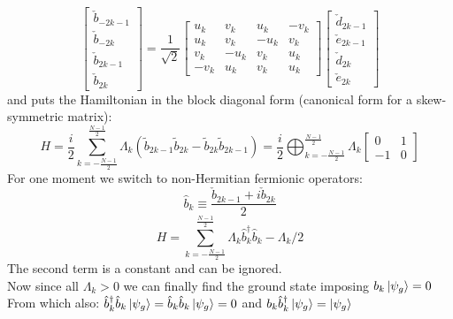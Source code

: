 \documentclass[12pt,a4paper]{book}
\theoremstyle{definition}
\begin{document}
\begin{equation}\label{eq:orthogonal}\left[\begin{array}{c}
		\check{b}_{-2 k-1} \\
		\check{b}_{-2 k} \\
		\check{b}_{2 k-1} \\
		\check{b}_{2 k}
	\end{array}\right]=\frac{1}{\sqrt{2}}\left[\begin{array}{cccc}
		u_{k} & v_{k} & u_{k} & -v_{k} \\
		u_{k} & v_{k} & -u_{k} & v_{k} \\
		v_{k} & -u_{k} & v_{k} & u_{k} \\
		-v_{k} & u_{k} & v_{k} & u_{k}
	\end{array}\right]\left[\begin{array}{c}
		\check{d}_{2 k-1} \\
		\check{e}_{2 k-1} \\
		\check{d}_{2 k} \\
		\check{e}_{2 k}
	\end{array}\right]\end{equation}	
and puts the Hamiltonian in the block diagonal form (canonical form for a skew-symmetric matrix):
\begin{equation}H=\frac{i}{2} \sum_{k=-\frac{N-1}{2}}^{\frac{N-1}{2}} \Lambda_k\left(\tilde{b}_{2 k-1} \tilde{b}_{2 k}-\tilde{b}_{2 k} \tilde{b}_{2 k-1}\right)=
	\frac{i}{2}\bigoplus_{k=-\frac{N-1}{2}}^{\frac{N-1}{2}} \Lambda_k\left[\begin{array}{cc}
		0 & 1 \\
		-1 & 0
	\end{array}\right]\end{equation}	
For one moment we switch to non-Hermitian fermionic operators:
\begin{equation}\hat{b}_{k} \equiv \frac{\check{b}_{2 k-1}+i \check{b}_{2 k}}{2}\end{equation}
\begin{equation}
	H= \sum_{k=-\frac{N-1}{2}}^{\frac{N-1}{2}} \Lambda_k\hat{b}_k^\dagger\hat{b}_k-\Lambda_k/2
\end{equation}
The second term is a constant and can be ignored.\\
Now since all $\Lambda_k>0$ we can finally find the ground state imposing
$b_k\ket{ \psi_g}=0$ \\ From which also: $\hat{b}_k^\dagger \hat{b}_k\ket{ \psi_g}=\hat{b}_k \hat{b}_k\ket{ \psi_g}=0$ and  $b_k \hat{b}_k^\dagger\ket{\psi_g}=\ket{\psi_g}$ \\
\end{document}
